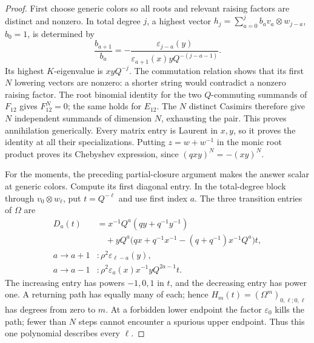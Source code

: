 \documentclass[11pt]{article}
\numberwithin{equation}{section}
\theoremstyle{definition}\newtheorem{definition}[theorem]{Definition}
\theoremstyle{remark}\newtheorem{remark}[theorem]{Remark}
\begin{document}
\begin{proof}
First choose generic colors so all roots and relevant raising factors
are distinct and nonzero. In total degree $j$, a highest vector
$h_j=\sum_{a=0}^jb_av_a\otimes w_{j-a}$, $b_0=1$, is determined by
\[
 \frac{b_{a+1}}{b_a}=
 -\frac{\varepsilon_{j-a}(y)}
 {\varepsilon_{a+1}(x)yQ^{-(j-a-1)}}.
\]
Its highest $K$-eigenvalue is $xyQ^{-j}$. The commutation relation shows that
its first $N$ lowering vectors are nonzero: a shorter string would
contradict a nonzero raising factor. The root binomial identity for
the two $Q$-commuting summands of $F_{12}$ gives $F_{12}^N=0$;
the same holds for $E_{12}$. The $N$ distinct Casimirs therefore give
$N$ independent summands of dimension $N$, exhausting the pair.
This proves annihilation generically. Every matrix entry is Laurent
in $x,y$, so it proves the identity at all their specializations.
Putting $z=w+w^{-1}$ in the monic root product proves its Chebyshev
expression, since $(qxy)^N=-(xy)^N$.

For the moments, the preceding partial-closure argument makes the
answer scalar at generic colors. Compute its first diagonal entry.
In the total-degree block through $v_0\otimes w_\ell$, put
$t=Q^{-\ell}$ and use first index $a$. The three transition entries
of $\Omega$ are
\begin{equation}\label{mt:path-entries}
\begin{aligned}
 D_a(t)&=x^{-1}Q^a(qy+q^{-1}y^{-1})\\
 &\quad+yQ^a\bigl(qx+q^{-1}x^{-1}-(q+q^{-1})x^{-1}Q^a\bigr)t,\\
 a\longrightarrow a+1 &: \rho^2\varepsilon_{\ell-a}(y),\\
 a\longrightarrow a-1 &: \rho^2\varepsilon_a(x)x^{-1}yQ^{2a-1}t.
\end{aligned}
\end{equation}
The increasing entry has powers $-1,0,1$ in $t$, and the decreasing
entry has power one. A returning path has equally many of each;
hence $H_m(t)=(\Omega^m)_{0,\ell;0,\ell}$ has degrees from zero to
$m$. At a forbidden lower endpoint the factor $\varepsilon_0$ kills
the path; fewer than $N$ steps cannot encounter a spurious upper
endpoint. Thus this one polynomial describes every $\ell$.


\end{proof}
\end{document}

